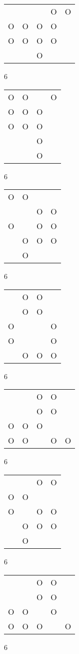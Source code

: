 \begin{tabular}{|m{0.2cm}m{0.2cm}m{0.2cm}m{0.2cm}m{0.2cm}|}\hline
 & & &O&O\\
O&O&O&O& \\
O&O&O&O& \\
 & &O& & \\
\hline\end{tabular}6
\begin{tabular}{|m{0.2cm}m{0.2cm}m{0.2cm}m{0.2cm}|}\hline
O&O& &O\\
O&O&O& \\
O&O&O& \\
 & &O& \\
 & &O& \\
\hline\end{tabular}6
\begin{tabular}{|m{0.2cm}m{0.2cm}m{0.2cm}m{0.2cm}|}\hline
O&O& & \\
 & &O&O\\
O& &O&O\\
 &O&O&O\\
 &O& & \\
\hline\end{tabular}6
\begin{tabular}{|m{0.2cm}m{0.2cm}m{0.2cm}m{0.2cm}|}\hline
 &O&O& \\
 &O&O& \\
O& & &O\\
O& & &O\\
 &O&O&O\\
\hline\end{tabular}6
\begin{tabular}{|m{0.2cm}m{0.2cm}m{0.2cm}m{0.2cm}m{0.2cm}|}\hline
 & &O&O& \\
 & &O&O& \\
O&O&O& & \\
O&O& &O&O\\
\hline\end{tabular}6
\begin{tabular}{|m{0.2cm}m{0.2cm}m{0.2cm}m{0.2cm}|}\hline
 & &O&O\\
O&O& & \\
O& &O&O\\
 &O&O&O\\
 &O& & \\
\hline\end{tabular}6
\begin{tabular}{|m{0.2cm}m{0.2cm}m{0.2cm}m{0.2cm}m{0.2cm}|}\hline
 & &O&O& \\
 & &O&O& \\
O&O& &O& \\
O&O&O& &O\\
\hline\end{tabular}6
